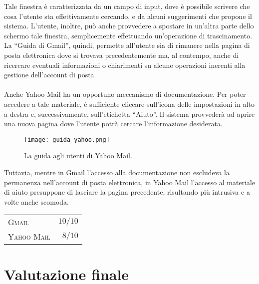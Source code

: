 		Tale finestra è caratterizzata da un campo di input, dove è possibile scrivere che cosa l'utente sta effettivamente cercando, e da alcuni suggerimenti che propone il sistema. L'utente, inoltre, può anche provvedere a spostare in un'altra parte dello schermo tale finestra, semplicemente effettuando un'operazione di trascinamento.\\
		La ``Guida di Gmail'', quindi, permette all'utente sia di rimanere nella pagina di posta elettronica dove si trovava precedentemente ma, al contempo, anche di ricercare eventuali informazioni o chiarimenti su alcune operazioni inerenti alla gestione dell'account di posta.\\
		\\
		Anche Yahoo Mail ha un opportuno meccanismo di documentazione. Per poter accedere a tale materiale, è sufficiente cliccare sull'icona delle impostazioni in alto a destra e, successivamente, sull'etichetta ``Aiuto''. Il sistema provvederà ad aprire una nuova pagina dove l'utente potrà cercare l'informazione desiderata.
		\begin{figure}[h!]
			\begin{center}
				\texttt{[image: guida\_yahoo.png]}
			\end{center}
			\caption[Guida di Yahoo Mail]{La guida agli utenti di Yahoo Mail.}
			\label{fig:guida_yahoo}
		\end{figure}
		
		Tuttavia, mentre in Gmail l'accesso alla documentazione non escludeva la permanenza nell'account di posta elettronica, in Yahoo Mail l'accesso al materiale di aiuto presuppone di lasciare la pagina precedente, risultando più intrusiva e a volte anche scomoda.
		
		\begin{flushleft}
			\begin{tabular}{lr}
				\textsc{Gmail} & $10/10$\\
				\textsc{Yahoo Mail} & $8/10$
			\end{tabular}
		\end{flushleft}
		
	\section{Valutazione finale} \label{sec:valutazione_finale}
	
